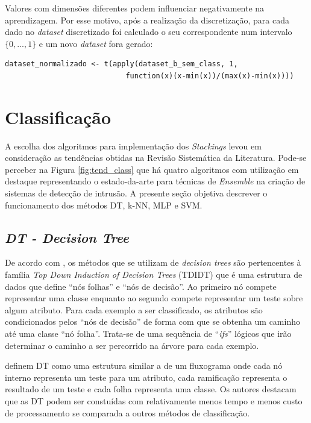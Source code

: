 Valores com dimensões diferentes podem influenciar negativamente na aprendizagem. Por esse motivo, após a realização da discretização, para cada dado no \textit{dataset} discretizado foi calculado o seu correspondente num intervalo $\{0, ..., 1\}$ e um novo \textit{dataset} fora gerado:

\begin{verbatim}
dataset_normalizado <- t(apply(dataset_b_sem_class, 1,
                            function(x)(x-min(x))/(max(x)-min(x))))
\end{verbatim}


\section{Classificação}
\label{secao-classificadores}
A escolha dos algoritmos para implementação dos \textit{Stackings} levou em consideração as tendências obtidas na Revisão Sistemática da Literatura. Pode-se perceber na Figura \ref{fig:tend_class} que há quatro algoritmos com utilização em destaque representando o estado-da-arte para técnicas de \textit{Ensemble} na criação de sistemas de detecção de intrusão. A presente seção objetiva descrever o funcionamento dos métodos DT, k-NN, MLP e SVM.

\subsection{\textit{DT - Decision Tree}}
\label{dt}

De acordo com , os métodos que se utilizam de \textit{decision trees} são pertencentes à família \textit{Top Down Induction of Decision Trees} (TDIDT) que é uma estrutura de dados que define ``nós folhas'' e ``nós de decisão''. Ao primeiro nó compete representar uma classe enquanto ao segundo compete representar um teste sobre algum atributo. Para cada exemplo a ser classificado, os atributos são condicionados pelos ``nós de decisão'' de forma com que se obtenha um caminho até uma classe ``nó folha''. Trata-se de uma sequência de ``\textit{ifs}'' lógicos que irão determinar o caminho a ser percorrido na árvore para cada exemplo.

 definem DT como uma estrutura similar a de um fluxograma onde cada nó interno representa um teste para um atributo, cada ramificação representa o resultado de um teste e cada folha representa uma classe. Os autores destacam que as DT podem ser constuídas com relativamente menos tempo e menos custo de processamento se comparada a outros métodos de classificação. 


